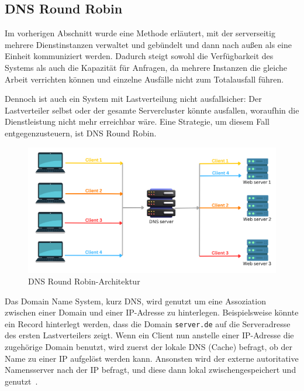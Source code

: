 \subsection{DNS Round Robin}
Im vorherigen Abschnitt wurde eine Methode erläutert, mit der serverseitig mehrere Dienstinstanzen verwaltet und gebündelt und dann nach außen als eine Einheit kommuniziert werden.
Dadurch steigt sowohl die Verfügbarkeit des Systems als auch die Kapazität für Anfragen, da mehrere Instanzen die gleiche Arbeit verrichten können und einzelne Ausfälle nicht zum Totalausfall führen.

Dennoch ist auch ein System mit Lastverteilung nicht ausfallsicher:
Der Lastverteiler selbst oder der gesamte Servercluster könnte ausfallen, woraufhin die Dienstleistung nicht mehr erreichbar wäre.
Eine Strategie, um diesem Fall entgegenzusteuern, ist DNS Round Robin.

\begin{figure}[t]
  \centering
  \includegraphics[width=\linewidth]{../images/roundrobindns}
  \caption{DNS Round Robin-Architektur~\cite{cloudns-roundrobin}}
    \label{fig:rrdns}
\end{figure}

Das Domain Name System, kurz DNS, wird genutzt um eine Assoziation zwischen einer Domain und einer IP-Adresse zu hinterlegen.
Beispielsweise könnte ein Record hinterlegt werden, dass die Domain \verb|server.de| auf die Serveradresse des ersten Lastverteilers zeigt.
Wenn ein Client nun anstelle einer IP-Adresse die zugehörige Domain benutzt, wird zuerst der lokale DNS (Cache) befragt, ob der Name zu einer IP aufgelöst werden kann.
Ansonsten wird der externe autoritative Namensserver nach der IP befragt, und diese dann lokal zwischengespeichert und genutzt~\cite{Kopparapu.2002}.


